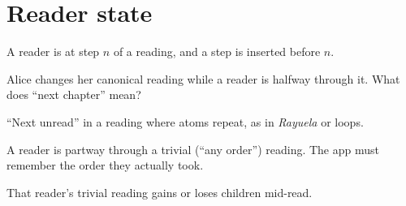 \documentclass{amsart}
\begin{document}
\section{Reader state}
\begin{todo}
\item A reader is at step $n$ of a reading, and a step is inserted before $n$.
\item Alice changes her canonical reading while a reader is halfway through it. What does ``next chapter'' mean?
\item ``Next unread'' in a reading where atoms repeat, as in \emph{Rayuela} or loops.
\item A reader is partway through a trivial (``any order'') reading. The app must remember the order they actually took.
\item That reader's trivial reading gains or loses children mid-read.
\end{todo}
\end{document}

